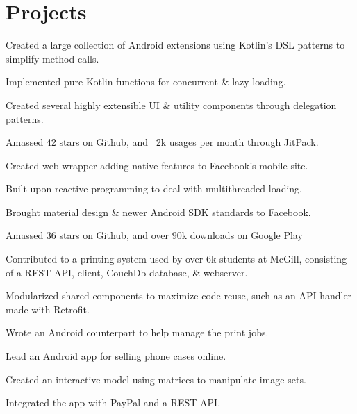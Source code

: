 \documentclass[]{allanwang-resume}
\begin{document}
\begin{minipage}[t]{0.66\textwidth}

	\section{Projects}

	\vspace{\topsep} %
	\begin{tightemize}
		\item Created a large collection of Android extensions using Kotlin's DSL patterns to simplify method calls.
		\item Implemented pure Kotlin functions for concurrent \& lazy loading.
		\item Created several highly extensible UI \& utility components through delegation patterns.
		\item Amassed 42 stars on Github, and ~2k usages per month through JitPack.
	\end{tightemize}

	\begin{tightemize}
		\item Created web wrapper adding native features to Facebook's mobile site.
		\item Built upon reactive programming to deal with multithreaded loading.
		\item Brought material design \& newer Android SDK standards to Facebook.
		\item Amassed 36 stars on Github, and over 90k downloads on Google Play
	\end{tightemize}

	\begin{tightemize}
		\item Contributed to a printing system used by over 6k students at McGill, consisting of a REST API, client, CouchDb database, \& webserver.
		\item Modularized shared components to maximize code reuse, such as an API handler made with Retrofit.
		\item Wrote an Android counterpart to help manage the print jobs.
	\end{tightemize}

	\begin{tightemize}
		\item Lead an Android app for selling phone cases online.
		\item Created an interactive model using matrices to manipulate image sets.
		\item Integrated the app with PayPal and a REST API.
	\end{tightemize}


\end{minipage}
\end{document}
